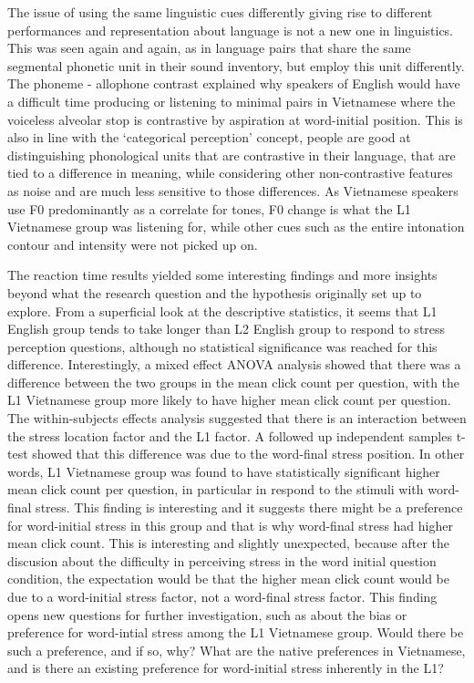 \documentclass[a4paper]{article}
\begin{document}
The issue of using the same linguistic cues differently giving rise to different performances and representation about language is not a new one in linguistics. This was seen again and again, as in language pairs that share the same segmental phonetic unit in their sound inventory, but employ this unit differently. The phoneme - allophone contrast explained why speakers of English would have a difficult time producing or listening to minimal pairs in Vietnamese where the voiceless alveolar stop is contrastive by aspiration at word-initial position. This is also in line with the `categorical perception' concept, people are good at distinguishing phonological units that are contrastive in their language, that are tied to a difference in meaning, while considering other non-contrastive features as noise and are much less sensitive to those differences. As Vietnamese speakers use F0 predominantly as a correlate for tones, F0 change is what the L1 Vietnamese group was listening for, while other cues such as the entire intonation contour and intensity were not picked up on.

The reaction time results yielded some interesting findings and more insights beyond what the research question and the hypothesis originally set up to explore. From a superficial look at the descriptive statistics, it seems that L1 English group tends to take longer than L2 English group to respond to stress perception questions, although no statistical significance was reached for this difference. Interestingly, a mixed effect ANOVA analysis showed that there was a difference between the two groups in the mean click count per question, with the L1 Vietnamese group more likely to have higher mean click count per question. The within-subjects effects analysis suggested that there is an interaction between the stress location factor and the L1 factor. A followed up independent samples t-test showed that this difference was due to the word-final stress position. In other words, L1 Vietnamese group was found to have statistically significant higher mean click count per question, in particular in respond to the stimuli with word-final stress. This finding is interesting and it suggests there might be a preference for word-initial stress in this group and that is why word-final stress had higher mean click count. This is interesting and slightly unexpected, because after the discusion about the difficulty in perceiving stress in the word initial question condition, the expectation would be that the higher mean click count would be due to a word-initial stress factor, not a word-final stress factor. This finding opens new questions for further investigation, such as about the bias or preference for word-intial stress among the L1 Vietnamese group. Would there be such a preference, and if so, why? What are the native preferences in Vietnamese, and is there an existing preference for word-initial stress inherently in the L1?
\end{document}

